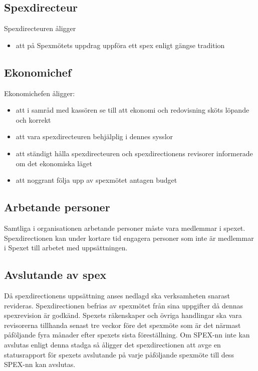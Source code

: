 \documentclass[a4paper]{article}
\begin{document}
\subsection{Spexdirecteur}
Spexdirecteuren åligger

\begin{itemize}
  \item att på Spexmötets uppdrag uppföra ett spex enligt gängse tradition
\end{itemize}

\subsection{Ekonomichef}
Ekonomichefen åligger:

\begin{itemize}
  \item att i samråd med kassören se till att ekonomi och redovisning sköts löpande och korrekt
  \item att vara spexdirecteuren behjälplig i dennes sysslor
  \item att ständigt hålla spexdirecteuren och spexdirectionens revisorer informerade om det ekonomiska läget
  \item att noggrant följa upp av spexmötet antagen budget
\end{itemize}

\subsection{Arbetande personer}
Samtliga i organisationen arbetande personer måste vara medlemmar i spexet. Spexdirectionen kan under kortare tid engagera personer som inte är medlemmar i Spexet till arbetet med uppsättningen.

\subsection{Avslutande av spex}
Då spexdirectionens uppsättning anses nedlagd ska verksamheten snarast revideras. Spexdirectionen befrias av spexmötet från sina uppgifter då dennas spexrevision är godkänd.\newline
\newline
Spexets räkenskaper och övriga handlingar ska vara revisorerna tillhanda senast tre veckor före det spexmöte som är det närmast påföljande fyra månader efter spexets sista föreställning.\newline
\newline
Om SPEX-nn inte kan avslutas enligt denna stadga så åligger det spexdirectionen att avge en statusrapport för spexets avslutande på varje påföljande spexmöte till dess SPEX-nn kan avslutas.
\end{document}
